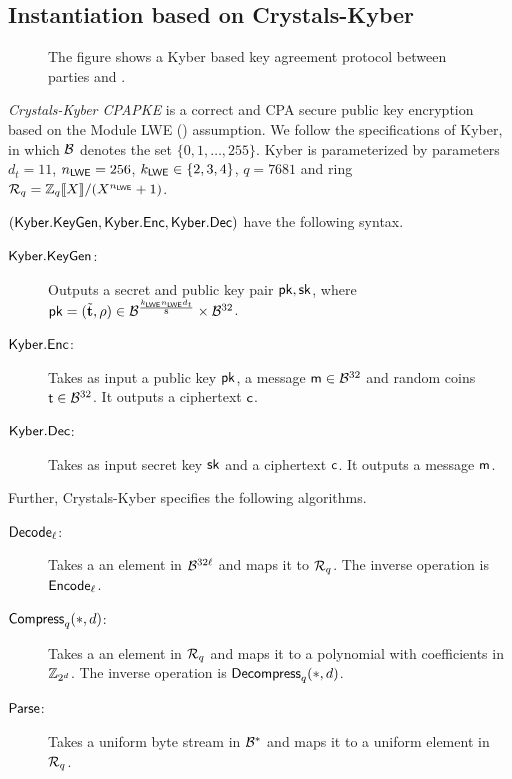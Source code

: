 \subsection{Instantiation based on Crystals-Kyber}
 

\begin{figure}[h!]
\centering
{}
\label{fig:Kyber}
\caption{The figure shows a Kyber based key agreement protocol between parties \A and \B.}
\end{figure}

\begin{definition}
\emph{ Crystals-Kyber CPAPKE} is a correct and CPA secure public key encryption based on the Module LWE (\MLWE) assumption. We follow the specifications of Kyber, in which $\mathcal{B}$ denotes the  set $\{0,1,\ldots,255\}$. Kyber is parameterized by parameters $d_t=11$, $n_{\mathsf{LWE}}=256$, $k_{\mathsf{LWE}}\in\{2,3,4\}$, $q=7681$ and ring $\mathcal R_q=\mathbb Z_q\llbracket X\rrbracket/(X^{n_{\mathsf{LWE}}}+1)$. 

$(\mathsf{Kyber.KeyGen},\mathsf{Kyber.Enc},\mathsf{Kyber.Dec})$ have the following syntax. 
\begin{description}
\item[$\mathsf{Kyber.KeyGen}$:] Outputs a secret and public key pair $\mathsf{pk},\mathsf{sk}$, where $\mathsf{pk}=(\tilde{{\mathbf t}},\rho)\in\mathcal{B}^{\frac{k_{\mathsf{LWE}}n_{\mathsf{LWE}} d_t}{8}}\times\mathcal{B}^{32}$.
\item[$\mathsf{Kyber.Enc}$:] Takes as input a public key $\mathsf{pk}$, a message $\mathsf{m}\in\mathcal{B}^{32}$ and random coins $\mathsf{t}\in\mathcal{B}^{32}$. It outputs a ciphertext $\mathsf{c}$.
\item[$\mathsf{Kyber.Dec}$:] Takes as input secret key $\mathsf{sk}$ and a ciphertext $\mathsf{c}$. It outputs a message $\mathsf{m}$.
\end{description}
Further, Crystals-Kyber specifies the following algorithms.
\begin{description}
\item[$\mathsf{Decode}_\ell$:] Takes a an element in $\mathcal{B}^{32\ell}$ and maps it to $\mathcal R_q$. The inverse operation is $\mathsf{Encode}_\ell$.
\item[$\mathsf{Compress}_q(*,d)$:] Takes a an element in $\mathcal R_q$ and maps it to a polynomial with coefficients in $\mathbb Z_{2^d}$. The inverse operation is $\mathsf{Decompress}_q(*,d)$.
\item[$\mathsf{Parse}$:] Takes a uniform byte stream in $\mathcal{B}^{*}$ and maps it to a uniform element in $\mathcal R_q$.
\end{description}
\end{definition}

